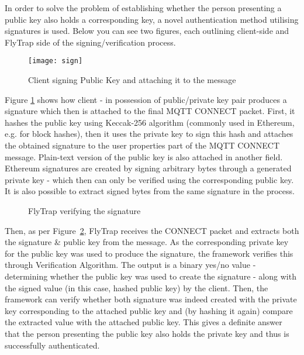 In order to solve the problem of establishing whether the person presenting a public key also holds a corresponding key, a novel authentication method utilising signatures is used. Below you can see two figures, each outlining client-side and FlyTrap side of the signing/verification process.

\begin{figure}[h]
    \centering
    \texttt{[image: sign]}
    \caption{Client signing Public Key and attaching it to the message}
    \label{fig:sign}
\end{figure}

Figure \ref{fig:sign} shows how client - in possession of public/private key pair produces a signature which then is attached to the final MQTT CONNECT packet. First, it hashes the public key using Keccak-256 algorithm \cite{bertoni2009keccak} (commonly used in Ethereum, e.g. for block hashes), then it uses the private key to sign this hash and attaches the obtained signature to the user properties part of the MQTT CONNECT message. Plain-text version of the public key is also attached in another field. Ethereum signatures are created by signing arbitrary bytes through a generated private key - which then can only be verified using the corresponding public key. It is also possible to extract signed bytes from the same signature in the process.

\begin{figure}[h]
    \centering
    \caption{FlyTrap verifying the signature}
    \label{fig:verify}
\end{figure}

Then, as per Figure~\ref{fig:verify}, FlyTrap receives the CONNECT packet and extracts both the signature \& public key from the message. As the corresponding private key for the public key was used to produce the signature, the framework verifies this through Verification Algorithm. The output is a binary yes/no value - determining whether the public key was used to create the signature - along with the signed value (in this case, hashed public key) by the client. Then, the framework can verify whether both signature was indeed created with the private key corresponding to the attached public key and (by hashing it again) compare the extracted value with the attached public key. This gives a definite answer that the person presenting the public key also holds the private key and thus is successfully authenticated.

